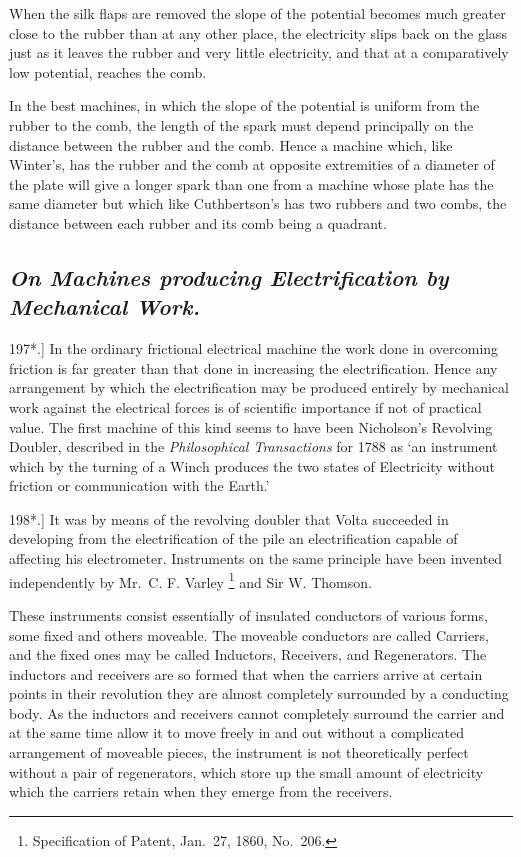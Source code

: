 \documentclass[12pt,oneside]{book}[2021/10/04]
\let\oldfootnote\footnote
\renewcommand\footnote[1]{%
\oldfootnote{\hspace{0.14em}#1}}
\newcommand{\Heading}{\centering\normalfont}
\newcommand{\Subsection}[1]{\subsection*{\normalsize\Heading\itshape #1}}
\newcommand{\Runhead}[1]{\fancyhead[C]{\iffloatpage{}{\small#1}}}
\newcommand{\article}[1]{\phantomsection \label{art:#1}{#1.]}}
\newcommand{\¬}{\hphantom{0}}
\begin{document}
When the silk flaps are removed the slope of the potential
becomes much greater close to the rubber than at any other place,
the electricity slips back on the glass just as it leaves the rubber
and very little electricity, and that at a comparatively low potential,
reaches the comb.

In the best machines, in which the slope of the potential is
uniform from the rubber to the comb, the length of the spark
must depend principally on the distance between the rubber and
the comb. Hence a machine which, like Winter's, has the rubber
and the comb at opposite extremities of a diameter of the plate will
give a longer spark than one from a machine whose plate has the
same diameter but which like Cuthbertson's has two rubbers and
two combs, the distance between each rubber and its comb being a
quadrant.

\Subsection{On Machines producing Electrification by Mechanical Work.}

\article{197*} In the ordinary frictional electrical machine the work done
in overcoming friction is far greater than that done in increasing
the electrification. Hence any arrangement by which the electrification
may be produced entirely by mechanical work against
the electrical forces is of scientific importance if not of practical
value. The first machine of this kind seems to have been Nicholson's
Revolving Doubler, described in the \textit{Philosophical Transactions} for
1788 as `an instrument which by the turning of a Winch produces
the two states of Electricity without friction or communication
with the Earth.'
\Runhead{THE REVOLVING DOUBLER.}

\article{198*} It was by means of the revolving doubler that Volta
succeeded in developing from the electrification of the pile an
electrification capable of affecting his electrometer. Instruments
on the same principle have been invented independently by Mr.\
C. F. Varley\footnote{
Specification of Patent, Jan.\ 27, 1860, No.\ 206.} and Sir W. Thomson.

These instruments consist essentially of insulated conductors of
various forms, some fixed and others moveable. The moveable
conductors are called Carriers, and the fixed ones may be called
Inductors, Receivers, and Regenerators. The inductors and receivers
are so formed that when the carriers arrive at certain points in
their revolution they are almost completely surrounded by a conducting
body. As the inductors and receivers cannot completely
surround the carrier and at the same time allow it to move freely
in and out without a complicated arrangement of moveable pieces,
the instrument is not theoretically perfect without a pair of regenerators,
which store up the small amount of electricity which
the carriers retain when they emerge from the receivers.
\end{document}
